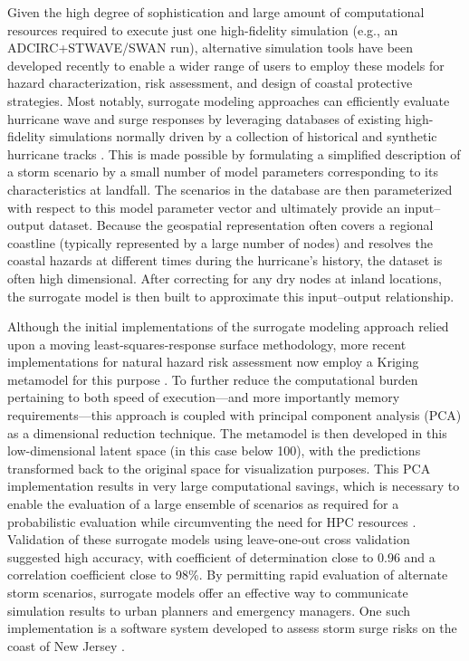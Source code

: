 Given the high degree of sophistication and large amount of computational resources required to execute just one high-fidelity simulation (e.g., an ADCIRC+STWAVE/SWAN run), alternative simulation tools have been developed recently to enable a wider range of users to employ these models for hazard characterization, risk assessment, and design of coastal protective strategies. Most notably, surrogate modeling approaches can efficiently evaluate hurricane wave and surge responses by leveraging databases of existing high-fidelity simulations normally driven by a collection of historical and synthetic hurricane tracks \citep{usace2015north}. This is made possible by formulating a simplified description of a storm scenario by a small number of model parameters corresponding to its characteristics at landfall. The scenarios in the database are then parameterized with respect to this model parameter vector and ultimately provide an input--output dataset. Because the geospatial representation often covers a regional coastline (typically represented by a large number of nodes) and resolves the coastal hazards at different times during the hurricane's history, the dataset is often high dimensional. After correcting for any dry nodes at inland locations, the surrogate model is then built to approximate this input--output relationship. 

Although the initial implementations of the surrogate modeling approach relied upon a moving least-squares-response surface methodology, more recent implementations for natural hazard risk assessment now employ a Kriging metamodel for this purpose \citep{jia2013kriging}. To further reduce the computational burden pertaining to both speed of execution---and more importantly memory requirements---this approach is coupled with principal component analysis (PCA) as a dimensional reduction technique. The metamodel is then developed in this low-dimensional latent space (in this case below 100), with the predictions transformed back to the original space for visualization purposes. This PCA implementation results in very large computational savings, which is necessary to enable the evaluation of a large ensemble of scenarios as required for a probabilistic evaluation while circumventing the need for HPC resources \citep{jia2013kriging}. Validation of these surrogate models using leave-one-out cross validation \citep{taflanidis2017advances} suggested high accuracy, with coefficient of determination close to 0.96 and a correlation coefficient close to 98\%. By permitting rapid evaluation of alternate storm scenarios, surrogate models offer an effective way to communicate simulation results to urban planners and emergency managers. One such implementation is a software system developed to assess storm surge risks on the coast of New Jersey \citep{njcoast2018implementation}.

